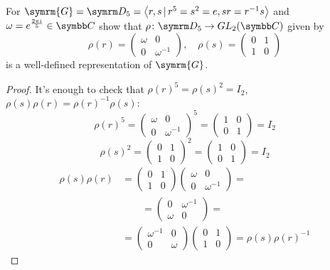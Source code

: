 \begin{exercise}
For \(\symrm{G} = \dihedralgroup{5} = \generatedby{r, s \vbar r^5 = s^2 = e, sr = r^{-1} s}\) and \(\omega = e^{\frac{2 \pi i}{5}} \in \complex\) show that \(\rho \colon \dihedralgroup{5} \to GL_2 (\complex)\) given by
\[
    \rho(r) = \begin{pmatrix}
        \omega & 0 \\
        0 & \omega^{-1}
    \end{pmatrix},
    \quad
    \rho(s) = \begin{pmatrix}
        0 & 1 \\
        1 & 0
    \end{pmatrix}
\]
is a well-defined representation of \(\symrm{G}\).
\end{exercise}
\begin{proof}
It's enough to check that \(\rho(r)^5 = \rho(s)^2 = I_2\), \(\rho(s) \rho(r) = \rho(r)^{-1} \rho(s)\):
\[
    \rho(r)^5 = \begin{pmatrix}
        \omega & 0 \\
        0 & \omega^{-1}
    \end{pmatrix}^5 = \begin{pmatrix}
        1 & 0 \\
        0 & 1
    \end{pmatrix} = I_2
\]
\[
    \rho(s)^2 = \begin{pmatrix}
        0 & 1 \\
        1 & 0
    \end{pmatrix}^2 = \begin{pmatrix}
        1 & 0 \\
        0 & 1
    \end{pmatrix} = I_2
\]
\begin{align*}
    \rho(s) \rho(r) &= \begin{pmatrix}
        0 & 1 \\
        1 & 0
    \end{pmatrix} \begin{pmatrix}
        \omega & 0 \\
        0 & \omega^{-1}
    \end{pmatrix} = \\
    &\qquad = \begin{pmatrix}
        0 & \omega^{-1} \\
        \omega & 0
    \end{pmatrix} = \\
    &= \begin{pmatrix}
        \omega^{-1} & 0 \\
        0 & \omega
    \end{pmatrix} \begin{pmatrix}
        0 & 1 \\
        1 & 0
    \end{pmatrix} = \rho(s) \rho(r)^{-1}
\end{align*}
\end{proof}
